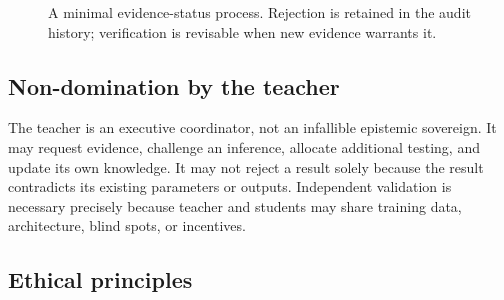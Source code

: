 \documentclass[11pt,a4paper]{article}
\begin{document}
\begin{figure}[ht]
\centering
{}
\caption{A minimal evidence-status process. Rejection is retained in the audit history; verification is revisable when new evidence warrants it.}
\label{fig:epistemic}
\end{figure}

\subsection{Non-domination by the teacher}

The teacher is an executive coordinator, not an infallible epistemic sovereign. It may request evidence, challenge an inference, allocate additional testing, and update its own knowledge. It may not reject a result solely because the result contradicts its existing parameters or outputs. Independent validation is necessary precisely because teacher and students may share training data, architecture, blind spots, or incentives.

\subsection{Ethical principles}
\end{document}
